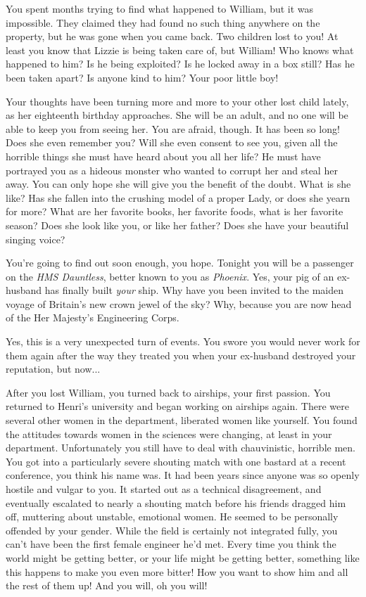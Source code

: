 \documentclass[char]{airship}
\begin{document}
You spent months trying to find what happened to William, but it was
impossible. They claimed they had found no such thing anywhere on the
property, but he was gone when you came back. Two children lost to
you! At least you know that Lizzie is being taken care of, but
William! Who knows what happened to him? Is he being exploited? Is he
locked away in a box still? Has he been taken apart? Is anyone kind to
him? Your poor little boy!

Your thoughts have been turning more and more to your other lost child
lately, as her eighteenth birthday approaches. She will be an adult,
and no one will be able to keep you from seeing her. You are afraid,
though. It has been so long! Does she even remember you? Will she even
consent to see you, given all the horrible things she must have heard
about you all her life? He must have portrayed you as a hideous
monster who wanted to corrupt her and steal her away. You can only
hope she will give you the benefit of the doubt. What is she like? Has
she fallen into the crushing model of a proper Lady, or does she yearn
for more?  What are her favorite books, her favorite foods, what is
her favorite season? Does she look like you, or like her father? Does
she have your beautiful singing voice?

You're going to find out soon enough, you hope. Tonight you will be a
passenger on the {\em HMS Dauntless}, better known to you as {\em
Phoenix}. Yes, your pig of an ex-husband has finally built {\em your}
ship. Why have you been invited to the maiden voyage of Britain's new
crown jewel of the sky? Why, because you are now head of the Her
Majesty's Engineering Corps.

Yes, this is a very unexpected turn of events. You swore you would
never work for them again after the way they treated you when your
ex-husband destroyed your reputation, but now...

After you lost William, you turned back to airships, your first
passion. You returned to Henri's university and began working on airships
again. There were several other women in the department, liberated
women like yourself. You found the attitudes towards women in the
sciences were changing, at least in your department. Unfortunately you
still have to deal with chauvinistic, horrible men. You got into a
particularly severe shouting match with one bastard at a recent
conference, \cCid{\intro} you think his name was. It had been years
since anyone was so openly hostile and vulgar to you. It started out
as a technical disagreement, and eventually escalated to nearly a
shouting match before his friends dragged him off, muttering about
unstable, emotional women. He seemed to be personally offended by your
gender. While the field is certainly not integrated fully, you can't
have been the first female engineer he'd met. Every time you think the
world might be getting better, or your life might be getting better,
something like this happens to make you even more bitter! How you want
to show him and all the rest of them up! And you will, oh you will!
\end{document}

